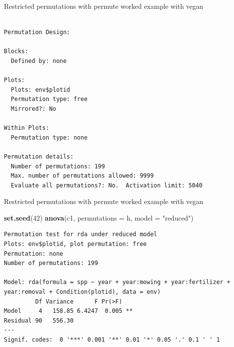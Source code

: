 \documentclass[10pt,ignorenonframetext,compress, aspectratio=169]{beamer}
\newenvironment{Shaded}{\begin{snugshade}}{\end{snugshade}}
\newcommand{\KeywordTok}[1]{\textcolor[rgb]{0.13,0.29,0.53}{\textbf{{#1}}}}
\newcommand{\DataTypeTok}[1]{\textcolor[rgb]{0.13,0.29,0.53}{{#1}}}
\newcommand{\DecValTok}[1]{\textcolor[rgb]{0.00,0.00,0.81}{{#1}}}
\newcommand{\StringTok}[1]{\textcolor[rgb]{0.31,0.60,0.02}{{#1}}}
\newcommand{\NormalTok}[1]{{#1}}
\begin{document}
\begin{frame}[fragile]{Restricted permutations with permute \textbar{}
worked example with vegan}

\scriptsize

\begin{Shaded}
\end{Shaded}

\begin{verbatim}

Permutation Design:

Blocks:
  Defined by: none

Plots:
  Plots: env$plotid
  Permutation type: free
  Mirrored?: No

Within Plots:
  Permutation type: none

Permutation details:
  Number of permutations: 199
  Max. number of permutations allowed: 9999
  Evaluate all permutations?: No.  Activation limit: 5040
\end{verbatim}

\end{frame}

\begin{frame}[fragile]{Restricted permutations with permute \textbar{}
worked example with vegan}

\scriptsize

\begin{Shaded}
\begin{Highlighting}[]
\KeywordTok{set.seed}\NormalTok{(}\DecValTok{42}\NormalTok{)}
\KeywordTok{anova}\NormalTok{(c1, }\DataTypeTok{permutations =} \NormalTok{h, }\DataTypeTok{model =} \StringTok{"reduced"}\NormalTok{)}
\end{Highlighting}
\end{Shaded}

\begin{verbatim}
Permutation test for rda under reduced model
Plots: env$plotid, plot permutation: free
Permutation: none
Number of permutations: 199

Model: rda(formula = spp ~ year + year:mowing + year:fertilizer + year:removal + Condition(plotid), data = env)
         Df Variance      F Pr(>F)   
Model     4   158.85 6.4247  0.005 **
Residual 90   556.30                 
---
Signif. codes:  0 '***' 0.001 '**' 0.01 '*' 0.05 '.' 0.1 ' ' 1
\end{verbatim}

\end{frame}
\end{document}
